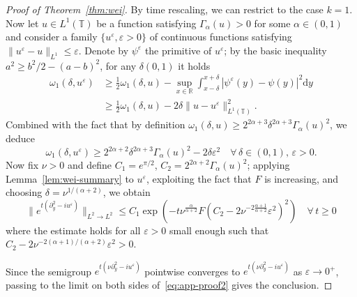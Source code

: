 \documentclass[11pt,oneside,reqno]{amsart}
\newcommand{\mathd}{\mathrm{d}}
\numberwithin{equation}{section}
\begin{document}
\begin{proof}[Proof of Theorem~\ref{thm:wei}]
  By time rescaling, we can restrict to the case $k = 1$. Now let $u \in L^1
  (\mathbb{T})$ be a function satisfying $\Gamma_{\alpha} (u) > 0$ for some
  $\alpha \in (0, 1)$ and consider a family $\{ u^{\varepsilon}, \varepsilon >
  0 \}$ of continuous functions satisfying $\| u^{\varepsilon} - u \|_{L^1}
  \leqslant \varepsilon$. Denote by $\psi^{\varepsilon}$ the primitive of
  $u^{\varepsilon}$; by the basic inequality $a^2 \geqslant b^2 / 2 - (a -
  b)^2$, for any $\delta (0, 1)$ it holds
  \[ \begin{array}{ll}
       \omega_1 (\delta, u^{\varepsilon}) & \geqslant \frac{1}{2} \omega_1
       (\delta, u) - \sup_{x \in \mathbb{R}} \int_{x - \delta}^{x + \delta} |
       \psi^{\varepsilon} (y) - \psi (y) |^2 \mathd y\\
       & \geqslant \frac{1}{2} \omega_1 (\delta, u) - 2 \delta \| u -
       u^{\varepsilon} \|_{L^1 (\mathbb{T})}^2 .
     \end{array} \]
  Combined with the fact that by definition $\omega_1 (\delta, u) \geqslant
  2^{2 \alpha + 3} \delta^{2 \alpha + 3} \Gamma_{\alpha} (u)^2$, we deduce
  \begin{equation}
    \omega_1 (\delta, u^{\varepsilon}) \geqslant 2^{2 \alpha + 2} \delta^{2
    \alpha + 3} \Gamma_{\alpha} (u)^2 - 2 \delta \varepsilon^2 \quad \forall
    \, \delta \in (0, 1), \, \varepsilon > 0.
  \end{equation}
  Now fix $\nu > 0$ and define $C_1 = e^{\pi / 2}$, $C_2 = 2^{2 \alpha + 2}
  \Gamma_{\alpha} (u)^2$; applying Lemma~\ref{lem:wei-summary} to
  $u^{\varepsilon}$, exploiting the fact that $F$ is increasing, and choosing
  $\delta = \nu^{1 / (\alpha + 2)}$, we obtain
  \begin{equation}
    \| e^{t (\partial_y^2 - i u^{\varepsilon})} \|_{L^2 \rightarrow L^2}
    \leqslant C_1 \exp \left( - t \nu^{\frac{\alpha}{\alpha + 2}} F \left( C_2
    - 2 \nu^{- 2 \frac{\alpha + 1}{\alpha + 2}} \varepsilon^2 \right)^2
    \right) \quad \forall \, t \geqslant 0 \label{eq:app-proof2}
  \end{equation}
  where the estimate holds for all $\varepsilon > 0$ small enough such that
  $C_2 - 2 \nu^{- 2 (\alpha + 1) / (\alpha + 2)} \varepsilon^2 > 0$.
  
  Since the semigroup $e^{t (\nu \partial_y^2 - i u^{\varepsilon})}$ pointwise
  converges to $e^{t (\nu \partial_y^2 - i u^{\varepsilon})}$ as $\varepsilon
  \rightarrow 0^+$, passing to the limit on both sides
  of~\eqref{eq:app-proof2} gives the conclusion.
\end{proof}
\end{document}
